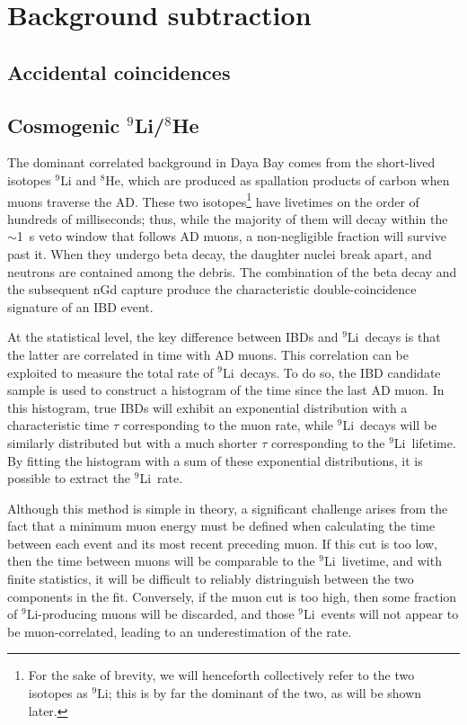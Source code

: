 \documentclass[../thesis.tex]{subfiles}
\begin{document}
\chapter{Background subtraction}
\label{chap:bkg}

\section{Accidental coincidences}

\section{Cosmogenic $^9$Li/$^8$He}

\newcommand\linine{$^9$Li}

The dominant correlated background in Daya Bay comes from the short-lived isotopes $^9$Li and $^8$He, which are produced as spallation products of carbon when muons traverse the AD. These two isotopes\footnote{For the sake of brevity, we will henceforth collectively refer to the two isotopes as \linine; this is by far the dominant of the two, as will be shown later.} have livetimes on the order of hundreds of milliseconds; thus, while the majority of them will decay within the $\sim$1~s veto window that follows AD muons, a non-negligible fraction will survive past it. When they undergo beta decay, the daughter nuclei break apart, and neutrons are contained among the debris. The combination of the beta decay and the subsequent nGd capture produce the characteristic double-coincidence signature of an IBD event.

At the statistical level, the key difference between IBDs and \linine\ decays is that the latter are correlated in time with AD muons. This correlation can be exploited to measure the total rate of \linine\ decays. To do so, the IBD candidate sample is used to construct a histogram of the time since the last AD muon. In this histogram, true IBDs will exhibit an exponential distribution with a characteristic time $\tau$ corresponding to the muon rate, while \linine\ decays will be similarly distributed but with a much shorter $\tau$ corresponding to the \linine\ lifetime. By fitting the histogram with a sum of these exponential distributions, it is possible to extract the \linine\ rate.

Although this method is simple in theory, a significant challenge arises from the fact that a minimum muon energy must be defined when calculating the time between each event and its most recent preceding muon. If this cut is too low, then the time between muons will be comparable to the \linine\ livetime, and with finite statistics, it will be difficult to reliably distringuish between the two components in the fit. Conversely, if the muon cut is too high, then some fraction of \linine-producing muons will be discarded, and those \linine\ events will not appear to be muon-correlated, leading to an underestimation of the rate.
\end{document}
